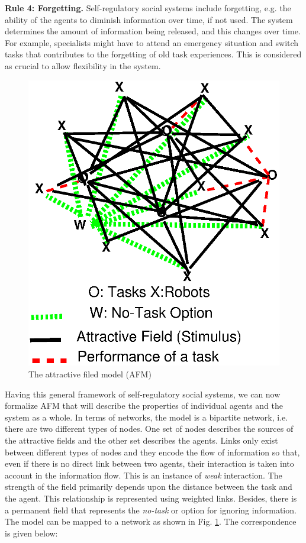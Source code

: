 \documentclass[final,5p,times,twocolumn]{elsarticle}
\begin{document}
\textbf{Rule 4: Forgetting.} Self-regulatory social systems include forgetting, e.g. the ability of the agents to diminish information over time, if not used. The system determines the amount of information being released, and this changes over time. For example, specialists might have to attend an emergency situation and switch tasks that contributes to the forgetting of old task experiences. This is considered as crucial to allow flexibility in the system.
\begin{figure}
\centering
\includegraphics[width=0.7\linewidth, angle=0]{./images/AFM-Diag2.eps}
\caption{The attractive filed model (AFM)}
\label{fig:afm} %
\end{figure}
Having this general framework of self-regulatory social systems, we can now formalize AFM that will describe the properties of individual  agents and the system as a whole. In terms of networks, the model is a bipartite network, i.e. there are two different types of nodes. One set of nodes describes the sources of the attractive fields and the other set describes the agents. Links only exist between different types of nodes and they encode the flow of information so that, even if there is no direct link between two agents, their interaction is taken into account in the information flow. This is an instance of {\em weak} interaction. The strength of the field primarily depends upon the distance between the task and the agent. This relationship is represented using weighted links. Besides, there is a permanent field that represents the {\em no-task} or  option for ignoring information. The model can be mapped to a network as shown in Fig. \ref{fig:afm}. The correspondence is given below:
\end{document}
